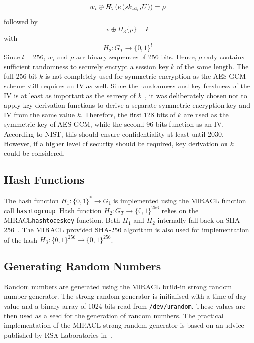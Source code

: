 \begin{equation*}
 w_i \oplus H_2 \left( e \left( sk_{\mathtt{id}_{i}}, U \right) \right) = \rho
\end{equation*}
followed by
\begin{equation*}
 v \oplus H_3 \{ \rho \} = k
\end{equation*}
with
\begin{equation*}
 H_2: G_T \rightarrow \{ 0,1 \}^{l}
\end{equation*}
Since $l=256$, $w_i$ and $\rho$ are binary sequences of 256 bits. Hence, $\rho$ only contains sufficient randomness to securely encrypt a session key $k$ of the same length. The full 256 bit $k$ is not completely used for symmetric encryption as the AES-GCM scheme still requires an IV as well. Since the randomness and key freshness of the IV is at least as important as the secrecy of $k$~\cite{nist:dworkin}, it was deliberately chosen not to apply key derivation functions to derive a separate symmetric encryption key and IV from the same value $k$. Therefore, the first 128 bits of $k$ are used as the symmetric key of AES-GCM, while the second 96 bits function as an IV. According to NIST, this should ensure confidentiality at least until 2030. However, if a higher level of security should be required, key derivation on $k$ could be considered.

\subsection{Hash Functions}
The hash function $H_1: \{ 0,1 \}^{*} \rightarrow G_1$ is implemented using the MIRACL function call \texttt{hash\textunderscore to\textunderscore group}. Hash function $H_2: G_T \rightarrow \{ 0,1 \}^{256}$ relies on the MIRACL\texttt{hash\textunderscore to\textunderscore aes\textunderscore key} function. Both $H_1$ and $H_2$ internally fall back on SHA-256~\cite{nist:fips1804}. The MIRACL provided SHA-256 algorithm is also used for implementation of the hash $H_3: \{ 0, 1 \}^{256} \rightarrow \{ 0,1 \}^{256}$.

\subsection{Generating Random Numbers}
Random numbers are generated using the MIRACL build-in strong random number generator. The strong random generator is initialised with a time-of-day value and a binary array of 1024 bits read from \texttt{/dev/urandom}. These values are then used as a seed for the generation of random numbers. The practical implementation of the MIRACL strong random generator is based on an advice published by RSA Laboratories in~\cite{art:Matthews96}.

